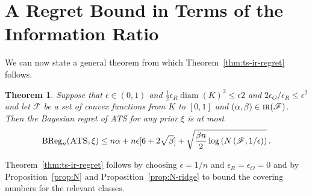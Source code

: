 \documentclass[letter, 12pt]{report}
\newcommand{\epsR}{{\epsilon_R}}
\newcommand{\epsO}{{\epsilon_O}}
\newcommand{\BReg}{\textrm{BReg}}
\newcommand{\sF}{\mathscr F}
\newcommand{\diam}{\operatorname{diam}}
\newcommand{\1}{\mathbf{1}}
\newcommand{\IR}{\operatorname{\textsc{ir}}}
\newcommand{\ats}{\textsc{ATS}}
\theoremstyle{plain}
\newtheorem{theorem}{Theorem}
\theoremstyle{definition}
\theoremstyle{remark}
\begin{document}
\section{A Regret Bound in Terms of the Information Ratio}\label{sec:ir-general}
We can now state a general theorem from which Theorem~\ref{thm:ts-ir-regret} follows.

\begin{theorem}\label{thm:ir-general}
    Suppose that $\epsilon \in (0,1)$ and $\frac{1}{2} \epsR \diam(K)^2 \leq \epsilon2$ and $2\epsO/\epsR \leq \epsilon^2$
    and let $\sF$ be a set of convex functions from $K$ to $[0,1]$ and $(\alpha, \beta) \in \IR(\sF)$.
    Then the Bayesian regret of \ats{} for any prior $\xi$ is at most
    \begin{align*}
        \BReg_n(\ats, \xi) \leq n \alpha + n\epsilon[6 + 2 \sqrt{\beta}] + \sqrt{\frac{\beta n}{2} \log\left(N\left(\sF, 1/\epsilon\right)\right)} \,.
    \end{align*}
\end{theorem}

Theorem~\ref{thm:ts-ir-regret} follows by choosing $\epsilon = 1/n$ and $\epsR = \epsO = 0$ and by
Proposition~\ref{prop:N} and Proposition~\ref{prop:N-ridge} to bound the covering numbers for the relevant classes.
\end{document}
